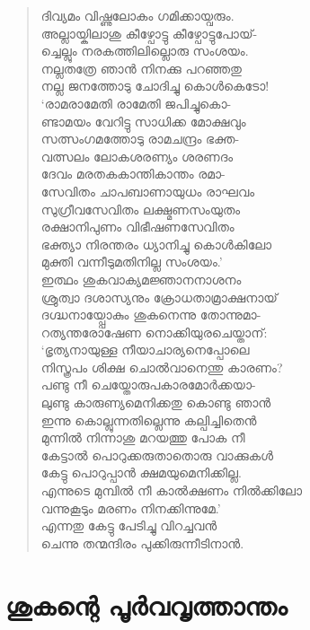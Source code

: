 \begin{verse}
ദിവ്യമം വിഷ്ണുലോകം ഗമിക്കായ്വരും.\\
അല്ലായ്കിലാശു കീഴ്പോട്ടു കീഴ്പോട്ടുപോയ്-\\
ച്ചെല്ലും നരകത്തിലില്ലൊരു സംശയം.\\
നല്ലതത്രേ ഞാന്‍ നിനക്കു പറഞ്ഞതു\\
നല്ല ജനത്തോടു ചോദിച്ചു കൊള്‍കെടോ!\\
‘രാമരാമേതി രാമേതി ജപിച്ചുകൊ-\\
ണ്ടാമയം വേറിട്ടു സാധിക്ക മോക്ഷവും\\
സത്സംഗമത്തോടു രാമചന്ദ്രം ഭക്ത-\\
വത്സലം ലോകശരണ്യം ശരണദം\\
ദേവം മരതകകാന്തികാന്തം രമാ-\\
സേവിതം ചാപബാണായുധം രാഘവം\\
സുഗ്രീവസേവിതം ലക്ഷ്മണസംയുതം\\
രക്ഷാനിപുണം വിഭീഷണസേവിതം\\
ഭക്ത്യാ നിരന്തരം ധ്യാനിച്ചു കൊള്‍കിലോ\\
മുക്തി വന്നീടുമതിനില്ല സംശയം.’\\
ഇത്ഥം ശുകവാക്യമജ്ഞാനനാശനം\\
ശ്രുത്വാ ദശാസ്യനും ക്രോധതാമ്രാക്ഷനായ്\\
ദഗ്ദ്ധനായ്പ്പോകും ശുകനെന്നു തോന്നുമാ-\\
റത്യന്തരോഷേണ നൊക്കിയുരചെയ്താന്:\\
‘ഭൃത്യനായുള്ള നീയാചാര്യനെപ്പോലെ\\
നിസ്ത്രപം ശിക്ഷ ചൊല്‍വാനെന്തു കാരണം?\\
പണ്ടു നീ ചെയ്തോരുപകാരമോര്‍ക്കയാ-\\
ലുണ്ടു കാരുണ്യമെനിക്കതു കൊണ്ടു ഞാന്‍\\
ഇന്നു കൊല്ലുന്നതില്ലെന്നു കല്പിച്ചിതെന്‍\\
മുന്നില്‍ നിന്നാശു മറയത്തു പോക നീ\\
കേട്ടാല്‍ പൊറുക്കരുതാതൊരു വാക്കുകള്‍\\
കേട്ടു പൊറുപ്പാന്‍ ക്ഷമയുമെനിക്കില്ല.\\
എന്നുടെ മുമ്പില്‍ നീ കാല്‍ക്ഷണം നില്‍ക്കിലോ\\
വന്നുകൂടും മരണം നിനക്കിന്നുമേ.’\\
എന്നതു കേട്ടു പേടിച്ചു വിറച്ചവന്‍\\
ചെന്നു തന്മന്ദിരം പുക്കിരുന്നീടിനാന്‍.
\end{verse}


\section{ശുകന്റെ പൂര്‍വവൃത്താന്തം}

